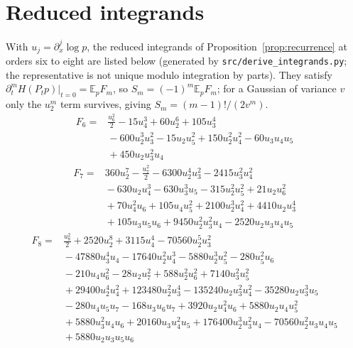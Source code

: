 \documentclass[11pt]{article}
\theoremstyle{definition}
\theoremstyle{remark}
\newcommand{\E}{\mathbb E}
\begin{document}
\section{Reduced integrands}\label{app:formulas}
With $u_j=\partial_x^j\log p$, the reduced integrands of
Proposition~\ref{prop:recurrence} at orders six to eight are listed below
(generated by \texttt{src/derive\_integrands.py}; the representative is not unique
modulo integration by parts). They satisfy $\partial_t^mH(P_tp)|_{t=0}=\E_pF_m$, so
$S_m=(-1)^m\E_pF_m$; for a Gaussian of variance $v$ only the $u_2^m$ term survives,
giving $S_m=(m-1)!/(2v^m)$.
{\small
\begin{align*}
F_{6}={}&\frac{u_{6}^{2}}{2} -15 u_{4}^{3} +60 u_{2}^{6} +105 u_{3}^{4}\\
&{}-600 u_{2}^{3} u_{3}^{2} -15 u_{2} u_{5}^{2} +150 u_{2}^{2} u_{4}^{2} -60 u_{3} u_{4} u_{5}\\
&{}+450 u_{2} u_{3}^{2} u_{4}
\end{align*}
\begin{align*}
F_{7}={}&360 u_{2}^{7} -\frac{u_{7}^{2}}{2} -6300 u_{2}^{4} u_{3}^{2} -2415 u_{3}^{2} u_{4}^{2}\\
&{}-630 u_{2} u_{4}^{3} -630 u_{3}^{3} u_{5} -315 u_{2}^{2} u_{5}^{2} +21 u_{2} u_{6}^{2}\\
&{}+70 u_{4}^{2} u_{6} +105 u_{4} u_{5}^{2} +2100 u_{2}^{3} u_{4}^{2} +4410 u_{2} u_{3}^{4}\\
&{}+105 u_{3} u_{5} u_{6} +9450 u_{2}^{2} u_{3}^{2} u_{4} -2520 u_{2} u_{3} u_{4} u_{5}
\end{align*}
\begin{align*}
F_{8}={}&\frac{u_{8}^{2}}{2} +2520 u_{2}^{8} +3115 u_{4}^{4} -70560 u_{2}^{5} u_{3}^{2}\\
&{}-47880 u_{3}^{4} u_{4} -17640 u_{2}^{2} u_{4}^{3} -5880 u_{2}^{3} u_{5}^{2} -280 u_{5}^{2} u_{6}\\
&{}-210 u_{4} u_{6}^{2} -28 u_{2} u_{7}^{2} +588 u_{2}^{2} u_{6}^{2} +7140 u_{3}^{2} u_{5}^{2}\\
&{}+29400 u_{2}^{4} u_{4}^{2} +123480 u_{2}^{2} u_{3}^{4} -135240 u_{2} u_{3}^{2} u_{4}^{2} -35280 u_{2} u_{3}^{3} u_{5}\\
&{}-280 u_{4} u_{5} u_{7} -168 u_{3} u_{6} u_{7} +3920 u_{2} u_{4}^{2} u_{6} +5880 u_{2} u_{4} u_{5}^{2}\\
&{}+5880 u_{3}^{2} u_{4} u_{6} +20160 u_{3} u_{4}^{2} u_{5} +176400 u_{2}^{3} u_{3}^{2} u_{4} -70560 u_{2}^{2} u_{3} u_{4} u_{5}\\
&{}+5880 u_{2} u_{3} u_{5} u_{6}
\end{align*}
}
\end{document}
